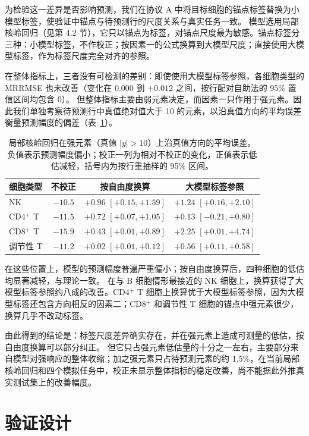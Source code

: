 \documentclass[11pt,a4paper]{article}
\begin{document}
为检验这一差异是否影响预测，我们在协议 A 中将目标细胞的锚点标签替换为小模型标签，使验证中锚点与待预测行的尺度关系与真实任务一致。
模型选用局部核岭回归（见第 4.2 节），它只以锚点为标签，对锚点尺度最为敏感。锚点标签分三种：小模型标签，不作校正；按因素一的公式换算到大模型尺度；直接使用大模型标签，作为标签尺度完全对齐的参照。

在整体指标上，三者没有可检测的差别：即使使用大模型标签参照，各细胞类型的 MRRMSE 也未改善（变化在 $0.000$ 到 $+0.012$ 之间，按行配对自助法的 95\% 置信区间均包含 0）。
但整体指标主要由弱元素决定，而因素一只作用于强元素。因此我们单独考察待预测行中真值绝对值大于 10 的元素，以沿真值方向的平均误差衡量预测幅度的偏差（表~\ref{tab:strong}）。

\begin{table}[!ht]
\centering\small
\caption{局部核岭回归在强元素（真值 $|y|>10$）上沿真值方向的平均误差。负值表示预测幅度偏小；校正一列为相对不校正的变化，正值表示低估减轻，括号内为按行重抽样的 95\% 区间。}\label{tab:strong}
\begin{tabular}{@{}lccc@{}}
\toprule
细胞类型 & 不校正 & 按自由度换算 & 大模型标签参照 \\
\midrule
NK & $-10.5$ & $+0.96$ $[+0.15, +1.59]$ & $+1.24$ $[+0.16, +2.10]$ \\
CD4$^+$ T & $-11.5$ & $+0.72$ $[+0.07, +1.05]$ & $+0.13$ $[-0.21, +0.80]$ \\
CD8$^+$ T & $-15.9$ & $+0.43$ $[+0.01, +0.89]$ & $+2.25$ $[+0.01, +4.74]$ \\
调节性 T & $-11.2$ & $+0.02$ $[+0.01, +0.12]$ & $+0.56$ $[+0.11, +0.58]$ \\
\bottomrule
\end{tabular}
\end{table}

在这些位置上，模型的预测幅度普遍严重偏小；按自由度换算后，四种细胞的低估均显著减轻，与理论一致。
在与 B 细胞情形最接近的 NK 细胞上，换算获得了大模型标签参照约八成的改善。CD4$^+$ T 细胞上换算优于大模型标签参照，因为大模型标签还包含方向相反的因素二；CD8$^+$ 和调节性 T 细胞的锚点中强元素很少，换算几乎不改动标签。

由此得到的结论是：标签尺度差异确实存在，并在强元素上造成可测量的低估，按自由度换算可以部分纠正。
但它只占强元素低估量的十分之一左右，主要部分来自模型对强响应的整体收缩；加之强元素只占待预测元素的约 1.5\%，在当前局部核岭回归和四个模拟任务中，校正未显示整体指标的稳定改善，尚不能据此外推真实测试集上的改善幅度。

\section{验证设计}
\end{document}
